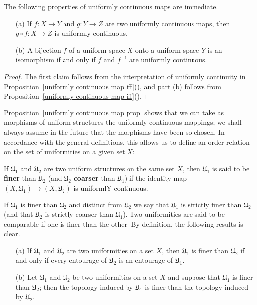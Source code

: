 The following properties of uniformly continuous maps are immediate.
\begin{proposition}\label{uniformly continuous map prop}
\mbox{}
\begin{itemize}
\item[(a)] If $f:X\to Y$ and $g:Y\to Z$ are two uniformly continuous maps, then $g\circ f:X\to Z$ is uniformly continuous.
\item[(b)] A bijection $f$ of a uniform space $X$ onto a uniform space $Y$ is an isomorphism if and only if $f$ and $f^{-1}$ are uniformly continuous.
\end{itemize}
\end{proposition}
\begin{proof}
The first claim follows from the interpretation of uniformly continuity in Proposition~\ref{uniformly continuous map iff}(), and part (b) follows from Proposition~\ref{uniformly continuous map iff}().
\end{proof}
Proposition~\ref{uniformly continuous map prop} shows that we can take as morphisms of uniform structures the uniformly continuous mappings; we shall always assume in the future that the morphisms have been so chosen. In accordance with the general definitions, this allows us to define an order relation on the set of uniformities on a given set $X$:
\begin{definition}
If $\mathfrak{U}_1$ and $\mathfrak{U}_2$ are two uniform structures on the same set $X$, then $\mathfrak{U}_1$ is said to be \textbf{finer} than $\mathfrak{U}_2$ (and $\mathfrak{U}_2$ \textbf{coarser} than $\mathfrak{U}_1$) if the identity map $(X,\mathfrak{U}_1)\to(X,\mathfrak{U}_2)$ is uniformlY continuous.
\end{definition}
If $\mathfrak{U}_1$ is finer than $\mathfrak{U}_2$ and distinct from $\mathfrak{U}_2$ we say that $\mathfrak{U}_1$ is strictly finer than $\mathfrak{U}_2$ (and that $\mathfrak{U}_2$ is strictly coarser than $\mathfrak{U}_1$). Two uniformities are said to be comparable if one is finer than the other. By definition, the following results is clear.
\begin{proposition}\label{uniformity finer iff}
\mbox{}
\begin{itemize}
\item[(a)] If $\mathfrak{U}_1$ and $\mathfrak{U}_2$ are two uniformities on a set $X$, then $\mathfrak{U}_1$ is finer than $\mathfrak{U}_2$ if and only if every entourage of $\mathfrak{U}_2$ is an entourage of $\mathfrak{U}_1$.
\item[(b)] Let $\mathfrak{U}_1$ and $\mathfrak{U}_2$ be two uniformities on a set $X$ and suppose that $\mathfrak{U}_1$ is finer than $\mathfrak{U}_2$; then the topology induced by $\mathfrak{U}_1$ is finer than the topology induced by $\mathfrak{U}_2$.
\end{itemize}
\end{proposition}
